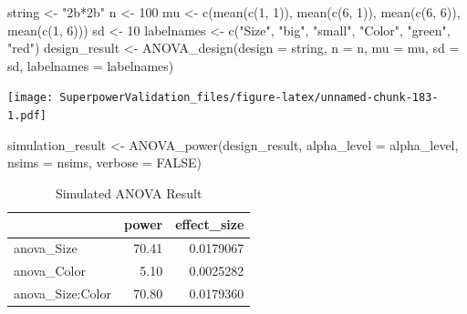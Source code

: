 \documentclass[
]{book}
\newenvironment{Shaded}{\begin{snugshade}}{\end{snugshade}}
\newcommand{\AttributeTok}[1]{\textcolor[rgb]{0.77,0.63,0.00}{#1}}
\newcommand{\ConstantTok}[1]{\textcolor[rgb]{0.00,0.00,0.00}{#1}}
\newcommand{\DecValTok}[1]{\textcolor[rgb]{0.00,0.00,0.81}{#1}}
\newcommand{\FunctionTok}[1]{\textcolor[rgb]{0.00,0.00,0.00}{#1}}
\newcommand{\NormalTok}[1]{#1}
\newcommand{\OtherTok}[1]{\textcolor[rgb]{0.56,0.35,0.01}{#1}}
\newcommand{\StringTok}[1]{\textcolor[rgb]{0.31,0.60,0.02}{#1}}
\begin{document}
\begin{Shaded}
\begin{Highlighting}[]
\NormalTok{string }\OtherTok{\textless{}{-}} \StringTok{"2b*2b"}
\NormalTok{n }\OtherTok{\textless{}{-}} \DecValTok{100}
\NormalTok{mu }\OtherTok{\textless{}{-}} \FunctionTok{c}\NormalTok{(}\FunctionTok{mean}\NormalTok{(}\FunctionTok{c}\NormalTok{(}\DecValTok{1}\NormalTok{, }\DecValTok{1}\NormalTok{)), }\FunctionTok{mean}\NormalTok{(}\FunctionTok{c}\NormalTok{(}\DecValTok{6}\NormalTok{, }\DecValTok{1}\NormalTok{)), }\FunctionTok{mean}\NormalTok{(}\FunctionTok{c}\NormalTok{(}\DecValTok{6}\NormalTok{, }\DecValTok{6}\NormalTok{)), }\FunctionTok{mean}\NormalTok{(}\FunctionTok{c}\NormalTok{(}\DecValTok{1}\NormalTok{, }\DecValTok{6}\NormalTok{)))}
\NormalTok{sd }\OtherTok{\textless{}{-}} \DecValTok{10}
\NormalTok{labelnames }\OtherTok{\textless{}{-}} \FunctionTok{c}\NormalTok{(}\StringTok{"Size"}\NormalTok{, }\StringTok{"big"}\NormalTok{, }\StringTok{"small"}\NormalTok{, }\StringTok{"Color"}\NormalTok{, }\StringTok{"green"}\NormalTok{, }\StringTok{"red"}\NormalTok{)}
\NormalTok{design\_result }\OtherTok{\textless{}{-}} \FunctionTok{ANOVA\_design}\NormalTok{(}\AttributeTok{design =}\NormalTok{ string,}
                   \AttributeTok{n =}\NormalTok{ n, }
                   \AttributeTok{mu =}\NormalTok{ mu, }
                   \AttributeTok{sd =}\NormalTok{ sd, }
                   \AttributeTok{labelnames =}\NormalTok{ labelnames)}
\end{Highlighting}
\end{Shaded}

\texttt{[image: SuperpowerValidation\_files/figure-latex/unnamed-chunk-183-1.pdf]}

\begin{Shaded}
\begin{Highlighting}[]
\NormalTok{simulation\_result }\OtherTok{\textless{}{-}} \FunctionTok{ANOVA\_power}\NormalTok{(design\_result, }
                                 \AttributeTok{alpha\_level =}\NormalTok{ alpha\_level, }
                                 \AttributeTok{nsims =}\NormalTok{ nsims,}
                                 \AttributeTok{verbose =} \ConstantTok{FALSE}\NormalTok{)}
\end{Highlighting}
\end{Shaded}

\begin{table}[!h]

\caption{\label{tab:unnamed-chunk-185}Simulated ANOVA Result}
\centering
\begin{tabular}[t]{l|r|r}
\hline
  & power & effect\_size\\
\hline
anova\_Size & 70.41 & 0.0179067\\
\hline
anova\_Color & 5.10 & 0.0025282\\
\hline
anova\_Size:Color & 70.80 & 0.0179360\\
\hline
\end{tabular}
\end{table}
\end{document}
